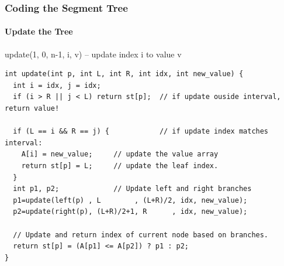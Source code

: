 \begin{frame}[fragile]
  \frametitle{Coding the Segment Tree}
  \framesubtitle{Update the Tree}

{\smaller
\begin{block}{update(1, 0, n-1, i, v) -- update index i to value v}
\begin{verbatim}
int update(int p, int L, int R, int idx, int new_value) {
  int i = idx, j = idx;
  if (i > R || j < L) return st[p];  // if update ouside interval, return value!

  if (L == i && R == j) {            // if update index matches interval:
    A[i] = new_value;     // update the value array
    return st[p] = L;     // update the leaf index.
  }
  int p1, p2;             // Update left and right branches
  p1=update(left(p) , L        , (L+R)/2, idx, new_value);
  p2=update(right(p), (L+R)/2+1, R      , idx, new_value);

  // Update and return index of current node based on branches.
  return st[p] = (A[p1] <= A[p2]) ? p1 : p2;
}
\end{verbatim}
\end{block}}
\end{frame}
